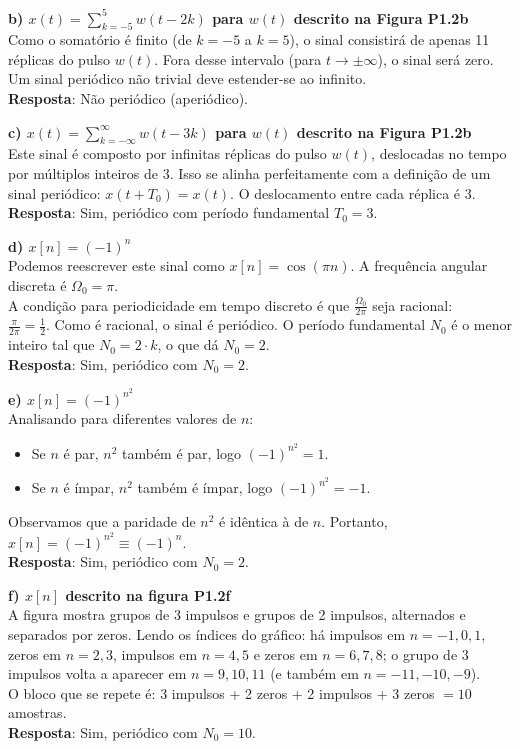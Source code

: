 \textbf{b) \(x(t) = \sum_{k=-5}^{5} w(t - 2k)\) para \(w(t)\) descrito na Figura P1.2b}\\
Como o somatório é finito (de \(k=-5\) a \(k=5\)), o sinal consistirá de apenas 11 réplicas do pulso \(w(t)\). Fora desse intervalo (para \(t \to \pm\infty\)), o sinal será zero. Um sinal periódico não trivial deve estender-se ao infinito.\\
\textbf{Resposta}: Não periódico (aperiódico).

\textbf{c) \(x(t) = \sum_{k=-\infty}^{\infty} w(t - 3k)\) para \(w(t)\) descrito na Figura P1.2b}\\
Este sinal é composto por infinitas réplicas do pulso \(w(t)\), deslocadas no tempo por múltiplos inteiros de \(3\). Isso se alinha perfeitamente com a definição de um sinal periódico: \(x(t+T_0) = x(t)\). O deslocamento entre cada réplica é \(3\).\\
\textbf{Resposta}: Sim, periódico com período fundamental \(T_0 = 3\).

\textbf{d) \(x[n] = (-1)^n\)}\\
Podemos reescrever este sinal como \(x[n] = \cos(\pi n)\). A frequência angular discreta é \(\Omega_0 = \pi\).\\
A condição para periodicidade em tempo discreto é que \(\frac{\Omega_0}{2\pi}\) seja racional:\\
\(\frac{\pi}{2\pi} = \frac{1}{2}\). Como é racional, o sinal é periódico. O período fundamental \(N_0\) é o menor inteiro tal que \(N_0 = 2 \cdot k\), o que dá \(N_0 = 2\).\\
\textbf{Resposta}: Sim, periódico com \(N_0 = 2\).

\textbf{e) \(x[n] = (-1)^{n^2}\)}\\
Analisando para diferentes valores de \(n\):

\begin{itemize}
\tightlist
\item
  Se \(n\) é par, \(n^2\) também é par, logo \((-1)^{n^2} = 1\).
\item
  Se \(n\) é ímpar, \(n^2\) também é ímpar, logo \((-1)^{n^2} = -1\).
\end{itemize}

Observamos que a paridade de \(n^2\) é idêntica à de \(n\). Portanto, \(x[n] = (-1)^{n^2} \equiv (-1)^n\).\\
\textbf{Resposta}: Sim, periódico com \(N_0 = 2\).

\textbf{f) \(x[n]\) descrito na figura P1.2f}\\
A figura mostra grupos de 3 impulsos e grupos de 2 impulsos, alternados e separados por zeros. Lendo os índices do gráfico: há impulsos em \(n = -1, 0, 1\), zeros em \(n = 2, 3\), impulsos em \(n = 4, 5\) e zeros em \(n = 6, 7, 8\); o grupo de 3 impulsos volta a aparecer em \(n = 9, 10, 11\) (e também em \(n = -11, -10, -9\)).\\
O bloco que se repete é: 3 impulsos + 2 zeros + 2 impulsos + 3 zeros \(= 10\) amostras.\\
\textbf{Resposta}: Sim, periódico com \(N_0 = 10\).

